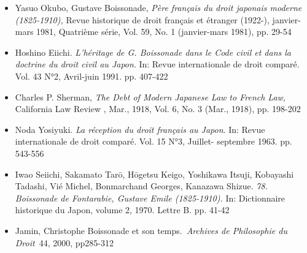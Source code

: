 \documentclass[11pt,a4paper]{article}
\begin{document}
\begin{itemize}[leftmargin=1.3em,itemsep=.18em,topsep=.25em]
\item
  Yasuo Okubo, Gustave Boissonade, \emph{Père français du droit japonais moderne (1825-1910),} Revue historique de droit français et étranger (1922-), janvier-mars 1981, Quatrième série, Vol. 59, No. 1 (janvier-mars 1981), pp. 29-54
\item
  Hoshino Eiichi. \emph{L’héritage de G. Boissonade dans le Code civil et dans la doctrine du droit civil au Japon}. In: Revue internationale de droit comparé. Vol. 43 N°2, Avril-juin 1991. pp. 407-422
\item
  Charles P. Sherman, \emph{The Debt of Modern Japanese Law to French Law,} California Law Review , Mar., 1918, Vol. 6, No. 3 (Mar., 1918), pp. 198-202
\item
  Noda Yosiyuki. \emph{La réception du droit français au Japon}. In: Revue internationale de droit comparé. Vol. 15 N°3, Juillet- septembre 1963. pp. 543-556
\item
  Iwao Seiichi, Sakamato Tarō, Hōgetsu Keigo, Yoshikawa Itsuji, Kobayashi Tadashi, Vié Michel, Bonmarchand Georges, Kanazawa Shizue. \emph{78. Boissonade de Fontarabie, Gustave Emile (1825-1910).} In: Dictionnaire historique du Japon, volume 2, 1970. Lettre B. pp. 41-42
\item
  Jamin, Christophe Boissonade et son temps.~\emph{Archives de Philosophie du Droit}~44, 2000, pp285-312
\end{itemize}
\end{document}

